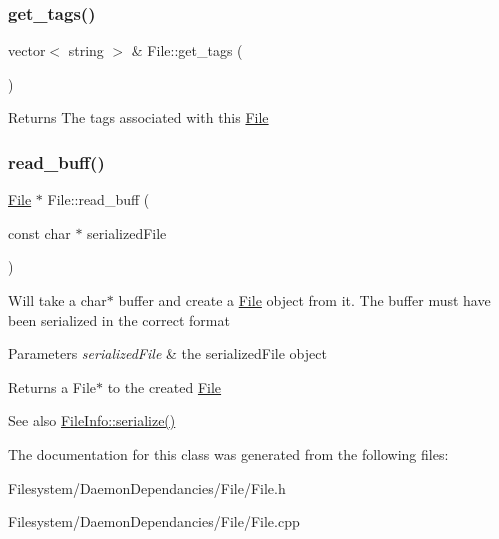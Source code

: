 \subsubsection{\texorpdfstring{get\+\_\+tags()}{get\_tags()}}
{\footnotesize\ttfamily vector$<$ string $>$ \& File\+::get\+\_\+tags (\begin{DoxyParamCaption}{ }\end{DoxyParamCaption})}

\begin{DoxyReturn}{Returns}
The tags associated with this \mbox{\hyperlink{classFile}{File}} 
\end{DoxyReturn}
\mbox{\label{classFile_a1118d477e6b00d789e948e8cca5ae393}} 
\subsubsection{\texorpdfstring{read\+\_\+buff()}{read\_buff()}}
{\footnotesize\ttfamily \mbox{\hyperlink{classFile}{File}} $\ast$ File\+::read\+\_\+buff (\begin{DoxyParamCaption}\item[{const char $\ast$}]{serialized\+File }\end{DoxyParamCaption})\hspace{0.3cm}{\ttfamily [static]}}

Will take a char$\ast$ buffer and create a \mbox{\hyperlink{classFile}{File}} object from it. The buffer must have been serialized in the correct format 
\begin{DoxyParams}{Parameters}
{\em serialized\+File} & the serialized\+File object \\
\hline
\end{DoxyParams}
\begin{DoxyReturn}{Returns}
a File$\ast$ to the created \mbox{\hyperlink{classFile}{File}} 
\end{DoxyReturn}
\begin{DoxySeeAlso}{See also}
\mbox{\hyperlink{classFileInfo_a64fc62c3e376dfd61088932d8b793589}{File\+Info\+::serialize()}} 
\end{DoxySeeAlso}


The documentation for this class was generated from the following files\+:\begin{DoxyCompactItemize}
\item 
Filesystem/\+Daemon\+Dependancies/\+File/File.\+h\item 
Filesystem/\+Daemon\+Dependancies/\+File/File.\+cpp\end{DoxyCompactItemize}
